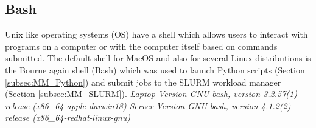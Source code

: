 \subsection{Bash}
Unix like operating systems (OS) have a shell which allows users to interact with programs on a computer or with the computer itself based on commands submitted.  The default shell for MacOS and also for several Linux distributions is the Bourne again shell (Bash) which was used to launch Python scripts (Section \ref{subsec:MM_Python}) and submit jobs to the SLURM workload manager (Section \ref{subsec:MM_SLURM}). 
\label{subsec:MM_Bash}
\newline
\textit{Laptop Version GNU bash, version 3.2.57(1)-release (x86\_64-apple-darwin18)}
\newline
\textit{Server Version GNU bash, version 4.1.2(2)-release (x86\_64-redhat-linux-gnu)}


